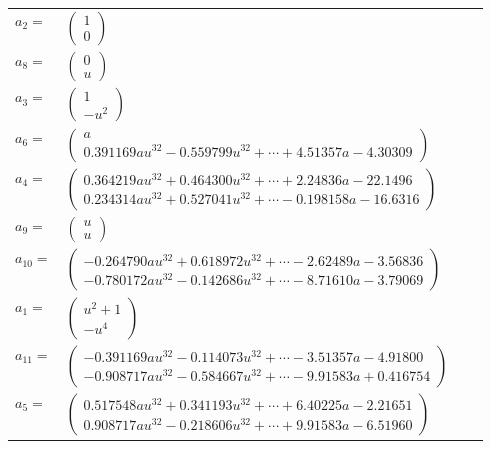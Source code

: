 \documentclass[1p]{elsarticle_modified}
\theoremstyle{definition}
\begin{document}
\begin{tabular}{m{7pt} m{180pt} m{7pt} m{180pt} }
\flushright $a_{2}=$&$\begin{pmatrix}1\\0\end{pmatrix}$ \\
\flushright $a_{8}=$&$\begin{pmatrix}0\\u\end{pmatrix}$ \\
\flushright $a_{3}=$&$\begin{pmatrix}1\\- u^2\end{pmatrix}$ \\
\flushright $a_{6}=$&$\begin{pmatrix}a\\0.391169 a u^{32}-0.559799 u^{32}+\cdots+4.51357 a-4.30309\end{pmatrix}$ \\
\flushright $a_{4}=$&$\begin{pmatrix}0.364219 a u^{32}+0.464300 u^{32}+\cdots+2.24836 a-22.1496\\0.234314 a u^{32}+0.527041 u^{32}+\cdots-0.198158 a-16.6316\end{pmatrix}$ \\
\flushright $a_{9}=$&$\begin{pmatrix}u\\u\end{pmatrix}$ \\
\flushright $a_{10}=$&$\begin{pmatrix}-0.264790 a u^{32}+0.618972 u^{32}+\cdots-2.62489 a-3.56836\\-0.780172 a u^{32}-0.142686 u^{32}+\cdots-8.71610 a-3.79069\end{pmatrix}$ \\
\flushright $a_{1}=$&$\begin{pmatrix}u^2+1\\- u^4\end{pmatrix}$ \\
\flushright $a_{11}=$&$\begin{pmatrix}-0.391169 a u^{32}-0.114073 u^{32}+\cdots-3.51357 a-4.91800\\-0.908717 a u^{32}-0.584667 u^{32}+\cdots-9.91583 a+0.416754\end{pmatrix}$ \\
\flushright $a_{5}=$&$\begin{pmatrix}0.517548 a u^{32}+0.341193 u^{32}+\cdots+6.40225 a-2.21651\\0.908717 a u^{32}-0.218606 u^{32}+\cdots+9.91583 a-6.51960\end{pmatrix}$ \\

\end{tabular}
\end{document}
